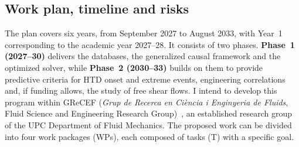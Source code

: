 \documentclass[11pt]{article}
\begin{document}
\subsection{Work plan, timeline and risks}\label{sec:workplan}

The plan covers six years, from September 2027 to August 2033, with Year~1 corresponding to the academic year 2027--28. 
It consists of two phases.
\textbf{Phase~1 (2027--30)} delivers the databases, the generalized causal framework and the optimized solver, while \textbf{Phase~2 (2030--33)} builds on them to provide predictive criteria for HTD onset and extreme events, engineering correlations and, if funding allows, the study of free shear flows.
I intend to develop this program within GReCEF (\emph{Grup de Recerca en Ci\`encia i Enginyeria de Fluids}, Fluid Science and Engineering Research Group)~\cite{GReCEF}, an established research group of the UPC Department of Fluid Mechanics. 
The proposed work can be divided into four work packages (WPs), each composed of tasks (T) with a specific goal.
\end{document}
